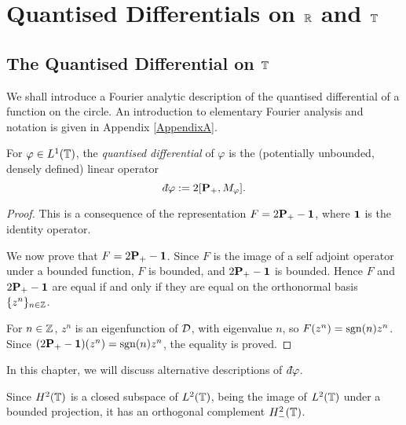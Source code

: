 
\chapter{Quantised Differentials on $\mathbb{R}$ and $\mathbb{T}$} %

\label{QuantisedDifferentialsOnRandT} %



\section{The Quantised Differential on $\mathbb{T}$}
We shall introduce a Fourier analytic description of the quantised differential
of a function on the circle. An introduction to elementary Fourier analysis and
notation is given in Appendix \ref{AppendixA}.

\begin{proposition}
    For $\varphi \in L^1(\mathbb{T})$, the \emph{quantised differential} of $\varphi$ is the (potentially unbounded, densely defined) linear operator
    \begin{equation*}
        \qd\varphi := 2[\Proj_+,M_\varphi].
    \end{equation*}
\end{proposition}
\begin{proof}
    This is a consequence of the representation $F = 2\mathbf{P}_+-\mathbf{1}$,
    where $\mathbf{1}$ is the identity operator.
    
    We now prove that $F = 2\mathbf{P}_+-\mathbf{1}$. Since $F$ is the image
    of a self adjoint operator under a bounded function, $F$ is bounded,
    and $2\mathbf{P}_+-\mathbf{1}$ is bounded. Hence $F$ and $2\mathbf{P}_+-\mathbf{1}$
    are equal if and only if they are equal on the orthonormal basis $\{z^n\}_{n\in\mathbb{Z}}$. 
    
    For $n \in \mathbb{Z}$, $z^n$ is an eigenfunction of $\mathcal{D}$, with eigenvalue
    $n$, so $F(z^n) = \operatorname{sgn}(n)z^n$. Since $(2\mathbf{P}_+-\mathbf{1})(z^n) = \operatorname{sgn}(n)z^n$,
    the equality is proved.
\end{proof}
In this chapter, we will discuss alternative descriptions of $\qd \varphi$.

Since $H^2(\mathbb{T})$
is a closed subspace of $L^2(\mathbb{T})$, being the image of $L^2(\mathbb{T})$
under a bounded projection, it has an orthogonal complement $H^2_-(\mathbb{T})$.

